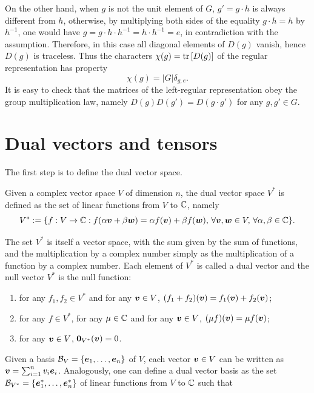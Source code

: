 On the other hand, when $g$ is not the unit element of $G$, $g' = g \cdot h$ is always different from $h$, otherwise, by multiplying both sides of the equality $g \cdot h = h$ by $h^{-1}$, one would have $g = g \cdot h \cdot h^{-1} = h \cdot h^{-1} = e$, in contradiction with the assumption. Therefore, in this case all diagonal elements of $D(g)$ vanish, hence $D(g)$ is traceless. Thus the characters $\chi(g) = \mathrm{tr}\,{[D(g)]}$ of the regular representation has property 
\begin{equation}
    \chi(g) = |G|\delta_{g,e}.
\end{equation}
It is easy to check that the matrices of the left-regular representation obey the group multiplication law, namely $D(g)D(g') = D(g \cdot g')$ for any $g,g' \in G$.

\section{Dual vectors and tensors}
The first step is to define the dual vector space.
\begin{defn}
    Given a complex vector space $V$ of dimension $n$, the dual vector space $V^*$ is defined as the set of linear functions from $V$ to $\mathbb{C}$, namely
    \begin{equation}
        V^* := \{f : V \to \mathbb{C} : f(\alpha\bm{v} + \beta\bm{w}) = \alpha f(\bm{v}) + \beta f(\bm{w}),\,\forall \bm{v},\bm{w} \in V,\,\forall \alpha,\beta \in \mathbb{C}\}.
    \end{equation}
\end{defn}
The set $V^*$ is itself a vector space, with the sum given by the sum of functions, and the multiplication by a complex number simply as the multiplication of a function by a complex number. Each element of $V^*$ is called a dual vector and the null vector $V^*$ is the null function:
\begin{enumerate}
    \item for any $f_1,f_2 \in V^*$ and for any $\bm{v} \in V$, $(f_1 + f_2)(\bm{v}) = f_1(\bm{v}) + f_2(\bm{v})$;
    \item for any $f \in V^*$, for any $\mu \in \mathbb{C}$ and for any $\bm{v} \in V$, $(\mu f)(\bm{v}) = \mu f(\bm{v})$;
    \item for any $\bm{v} \in V$, $\bm{0}_{V^*}(\bm{v}) = 0$.
\end{enumerate}
Given a basis $\mathcal{B}_V = \{\bm{e}_1,\dots,\bm{e}_n\}$ of $V$, each vector $\bm{v} \in V$ can be written as $\bm{v} = \sum_{i=1}^nv_i\bm{e}_i$. Analogously, one can define a dual vector basis as the set $\mathcal{B}_{V^*} = \{\bm{e}_1^*,\dots,\bm{e}_n^*\}$ of linear functions from $V$ to $\mathbb{C}$ such that
